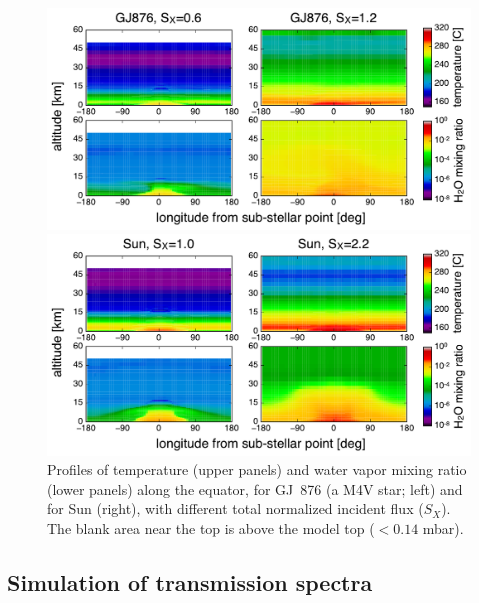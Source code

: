 \documentclass[11pt,numberedappendix,twocolappendix,]{emulateapj}
\def\wv{water vapor}
\begin{document}
\begin{figure}[tb]
    \begin{minipage}{0.5\hsize}
\includegraphics[width=\hsize]{AqOH0TLS_GJ876_temp_xH2O.pdf}
    \end{minipage}
    \begin{minipage}{0.5\hsize}
\includegraphics[width=\hsize]{AqOH0TLS_Sun_temp_xH2O.pdf}
    \end{minipage}
    \caption{Profiles of temperature (upper panels) and \wv{} mixing ratio (lower panels) along the equator, for GJ~876 (a M4V star; left) and for Sun (right), with different total normalized incident flux ($S_X$). The blank area near the top is above the model top ($< 0.14$ mbar).}
\label{fig:3Dprofile_equator}
\end{figure}


\subsection{Simulation of transmission spectra}
\label{ss:method_TransmissionSpectra}
\end{document}

